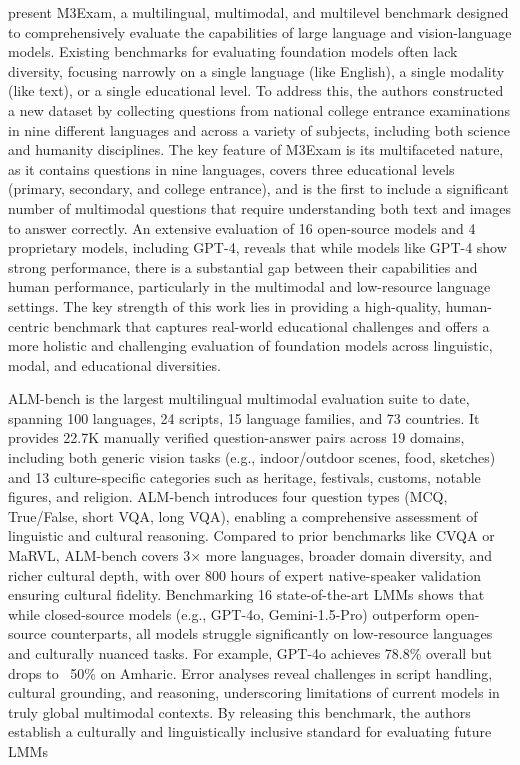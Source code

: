 \documentclass[acmsmall]{acmart}
\begin{document}
\citep{zhang2023m3exam} present M3Exam, a multilingual, multimodal, and multilevel benchmark designed to comprehensively evaluate the capabilities of large language and vision-language models. Existing benchmarks for evaluating foundation models often lack diversity, focusing narrowly on a single language (like English), a single modality (like text), or a single educational level. To address this, the authors constructed a new dataset by collecting questions from national college entrance examinations in nine different languages and across a variety of subjects, including both science and humanity disciplines. The key feature of M3Exam is its multifaceted nature, as it contains questions in nine languages, covers three educational levels (primary, secondary, and college entrance), and is the first to include a significant number of multimodal questions that require understanding both text and images to answer correctly. An extensive evaluation of 16 open-source models and 4 proprietary models, including GPT-4, reveals that while models like GPT-4 show strong performance, there is a substantial gap between their capabilities and human performance, particularly in the multimodal and low-resource language settings. The key strength of this work lies in providing a high-quality, human-centric benchmark that captures real-world educational challenges and offers a more holistic and challenging evaluation of foundation models across linguistic, modal, and educational diversities.

\citep{vayani2025languagesmatterevaluatinglmms} ALM-bench is the largest multilingual multimodal evaluation suite to date, spanning 100 languages, 24 scripts, 15 language families, and 73 countries. It provides 22.7K manually verified question-answer pairs across 19 domains, including both generic vision tasks (e.g., indoor/outdoor scenes, food, sketches) and 13 culture-specific categories such as heritage, festivals, customs, notable figures, and religion. ALM-bench introduces four question types (MCQ, True/False, short VQA, long VQA), enabling a comprehensive assessment of linguistic and cultural reasoning. Compared to prior benchmarks like CVQA or MaRVL, ALM-bench covers 3× more languages, broader domain diversity, and richer cultural depth, with over 800 hours of expert native-speaker validation ensuring cultural fidelity. Benchmarking 16 state-of-the-art LMMs shows that while closed-source models (e.g., GPT-4o, Gemini-1.5-Pro) outperform open-source counterparts, all models struggle significantly on low-resource languages and culturally nuanced tasks. For example, GPT-4o achieves 78.8\% overall but drops to ~50\% on Amharic. Error analyses reveal challenges in script handling, cultural grounding, and reasoning, underscoring limitations of current models in truly global multimodal contexts. By releasing this benchmark, the authors establish a culturally and linguistically inclusive standard for evaluating future LMMs
\end{document}
